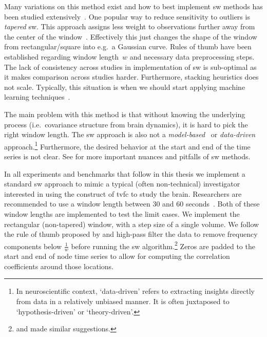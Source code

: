 Many variations on this method exist and how to best implement \gls{sw} methods has been studied extensively~\parencite[see e.g.][]{Mokhtari2019, Vergara2019}.
One popular way to reduce sensitivity to outliers is \emph{tapered} \gls{sw}.
This approach assigns less weight to observations further away from the center of the window~\parencite{Allen2014, Lindquist2014}.
Effectively this just changes the shape of the window from rectangular/square into e.g.~a Gaussian curve.
%
Rules of thumb have been established regarding window length~$w$ and necessary data preprocessing steps.
%
The lack of consistency across studies in implementation of \gls{sw} is sub-optimal as it makes comparison across studies harder.
Furthermore, stacking heuristics does not scale.
Typically, this situation is when we should start applying machine learning techniques~\parencite[][built this case beautifully]{Zinkevich2015}.

The main problem with this method is that without knowing the underlying process (i.e.~covariance structure from brain dynamics), it is hard to pick the right window length.
%
The \gls{sw} approach is also not a \emph{model-based}~\parencite{Foti2019} or \emph{data-driven} approach.\footnote{In neuroscientific context, `data-driven' refers to extracting insights directly from data in a relatively unbiased manner. It is often juxtaposed to `hypothesis-driven' or `theory-driven'.}
Furthermore, the desired behavior at the start and end of the time series is not clear.
See \textcite{Lindquist2014, Leonardi2015, Hindriks2016} for more important nuances and pitfalls of \gls{sw} methods.

In all experiments and benchmarks that follow in this thesis we implement a standard \gls{sw} approach to mimic a typical (often non-technical) investigator interested in using the construct of \gls{tvfc} to study the brain.
Researchers are recommended to use a window length between 30 and 60 seconds~\parencite{Shirer2012}.
Both of these window lengths are implemented to test the limit cases.
We implement the rectangular (non-tapered) window, with a step size of a single volume.
We follow the rule of thumb proposed by \textcite{Leonardi2015} and high-pass filter the data to remove frequency components below $\frac{1}{w}$ before running the \gls{sw} algorithm.\footnote{\textcite{Smith2012} and \textcite{Hutchison2013} made similar suggestions.}
Zeros are padded to the start and end of node time series to allow for computing the correlation coefficients around those locations.

